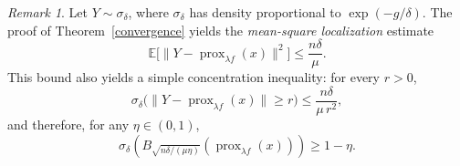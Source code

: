 \documentclass[11pt]{amsart}
\newcommand{\1}{\mathds{1}}
\theoremstyle{definition}
\theoremstyle{remark}
\newtheorem{remark}[theorem]{Remark}
\theoremstyle{definition}
\newcommand{\E}{\mathbb{E}}
\begin{document}
\begin{remark}%
Let \(Y\sim\sigma_\delta\), where \(\sigma_\delta\) has density proportional to \(\exp(-g/\delta)\).
The proof of Theorem~\ref{convergence} yields the \emph{mean-square localization} estimate
\begin{equation*}
\E\big[\|Y-\operatorname{prox}_{\lambda f}(x)\|^2\big]\le \frac{n\delta}{\mu}.
\end{equation*}
This bound also yields a simple concentration inequality: for every \(r>0\),
\begin{equation*}
\sigma_\delta\!\big(\|Y-\operatorname{prox}_{\lambda f}(x)\|\ge r\big)\le \frac{n\delta}{\mu\,r^2},
\end{equation*}
and therefore, for any \(\eta\in(0,1)\),
\begin{equation*}
\sigma_\delta\!\left(B_{\sqrt{n\delta/(\mu\eta)}}(\operatorname{prox}_{\lambda f}(x))\right)\ge 1-\eta.
\end{equation*}
\end{remark}
\end{document}
